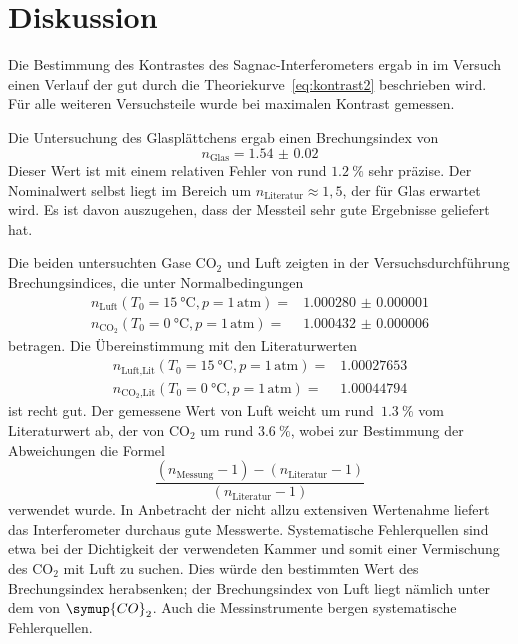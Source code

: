 \section{Diskussion}
\label{sec:diskussion}

Die Bestimmung des Kontrastes des Sagnac-Interferometers ergab in
im Versuch einen Verlauf der gut durch die Theoriekurve~\eqref{eq:kontrast2}
beschrieben wird. Für alle weiteren Versuchsteile wurde bei maximalen Kontrast
gemessen.

Die Untersuchung des Glasplättchens ergab einen Brechungsindex von
\begin{equation}
  n_{\text{Glas}}=\num{1.54(2)}
\end{equation}
Dieser Wert ist mit einem relativen Fehler von rund $\SI{1.2}{\percent}$ sehr
präzise. Der Nominalwert selbst liegt im Bereich um
$n_\text{Literatur}\approx 1,5$, der für Glas erwartet wird. Es ist davon
auszugehen, dass der Messteil sehr gute Ergebnisse geliefert hat.

Die beiden untersuchten Gase $\text{CO}_2$ und Luft zeigten in der
Versuchsdurchführung Brechungsindices, die unter Normalbedingungen
%
\begin{align}
  n_{\text{Luft}}(T_0=\SI{15}{\celsius}, p=1\,\text{atm})=&\num{1.000280(1)} \\
  n_{\text{CO}_2}(T_0=\SI{0}{\celsius}, p=1\,\text{atm})=&\num{1.000432(6)}
\end{align}
%
betragen. Die Übereinstimmung mit den Literaturwerten~\cite{brechungsindices}
%
\begin{align}
  n_{\text{Luft}\text{,Lit}}(T_0=\SI{15}{\celsius}, p=1\,\text{atm})=&\num{1.00027653} \\
  n_{\text{CO}_2\text{,Lit}}(T_0=\SI{0}{\celsius}, p=1\,\text{atm})=&\num{1.00044794}
\end{align}
%
ist recht gut. Der gemessene Wert von Luft weicht um
rund~$\SI{1.3}{\percent}$ vom Literaturwert ab, der von $\text{CO}_2$ um rund
$\SI{3.6}{\percent}$, wobei zur Bestimmung der Abweichungen die Formel
%
\begin{equation}
  \frac{(n_{\text{Messung}}-1)-(n_{\text{Literatur}}-1)}
  {(n_{\text{Literatur}}-1)}
\end{equation}
%
verwendet wurde. In Anbetracht der nicht allzu extensiven Wertenahme liefert das
Interferometer durchaus gute Messwerte. Systematische Fehlerquellen sind etwa bei
der Dichtigkeit der verwendeten Kammer und somit einer Vermischung des
$\text{CO}_2$ mit Luft zu suchen. Dies würde den bestimmten Wert des
Brechungsindex herabsenken; der Brechungsindex von Luft liegt nämlich unter dem
von $\symup{CO}_2$. Auch die Messinstrumente bergen systematische Fehlerquellen.
